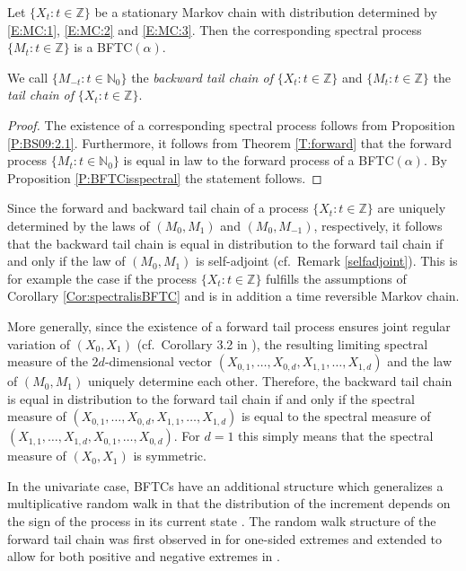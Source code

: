 \documentclass{aptpubarxiv}
\numberwithin{equation}{section}
\begin{document}
\begin{cor}
\label{Cor:spectralisBFTC}
Let $\{ X_t : t \in {\mathbb{Z}}\}$ be a stationary Markov chain with distribution determined by \eqref{E:MC:1}, \eqref{E:MC:2} and \eqref{E:MC:3}. Then the corresponding spectral process $\{M_t:t \in \mathbb{Z}\}$ is a BFTC$(\alpha)$. 

We call $\{M_{-t}: t \in \mathbb{N}_0\}$ the \emph{backward tail chain of} $\{X_t:t \in \mathbb{Z}\}$ and $\{M_t: t \in \mathbb{Z}\}$ the \emph{tail chain of} $\{X_t:t \in \mathbb{Z}\}$.
\end{cor}
\begin{proof}
The existence of a corresponding spectral process follows from Proposition \ref{P:BS09:2.1}. Furthermore, it follows from Theorem \ref{T:forward} that the forward process $\{M_t:t \in \mathbb{N}_0\}$ is equal in law to the forward process of a BFTC$(\alpha)$. By Proposition \ref{P:BFTCisspectral} the statement follows. 
\end{proof}

\begin{rem}
Since the forward and backward tail chain of a process $\{X_t:t\in \mathbb{Z}\}$ are uniquely determined by the laws of $(M_0, M_1)$ and $(M_0, M_{-1})$, respectively, it follows that the backward tail chain is equal in distribution to the forward tail chain if and only if the law of $(M_0, M_1)$ is self-adjoint (cf.\ Remark \ref{selfadjoint}). This is for example the case if the process $\{X_t: t \in \mathbb{Z}\}$ fulfills the assumptions of Corollary \ref{Cor:spectralisBFTC} and is in addition a time reversible Markov chain. 

More generally, since the existence of a forward tail process ensures joint regular variation of $(X_0, X_1)$ (cf.\ Corollary 3.2 in \cite{BS09}), the resulting limiting spectral measure of the $2d$-dimensional vector $(X_{0,1}, \ldots, X_{0,d}, X_{1,1}, \ldots, X_{1,d})$ and the law of $(M_0,M_1)$ uniquely determine each other. Therefore, the backward tail chain is equal in distribution to the forward tail chain if and only if the spectral measure of $(X_{0,1}, \ldots, X_{0,d}, X_{1,1}, \ldots, X_{1,d})$ is equal to the spectral measure of $(X_{1,1}, \ldots, X_{1,d}, X_{0,1}, \ldots, X_{0,d})$. For $d=1$ this simply means that the spectral measure of $(X_0,X_1)$ is symmetric.    
\end{rem}

In the univariate case, BFTCs have an additional structure which generalizes a multiplicative  random walk in that the distribution of the increment depends on the sign of the process in its current state \citep{S07}. The random walk structure of the forward tail chain was first observed in \cite{Smith92} for one-sided extremes and extended to allow for both positive and negative extremes in \cite{BC03}.
\end{document}
